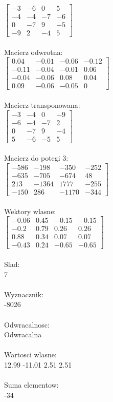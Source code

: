 \documentclass[a4paper,12pt]{article}
\begin{document}
$\begin{bmatrix} -3&-6&0&5\\-4&-4&-7&-6\\0&-7&9&-5\\-9&2&-4&5 \end{bmatrix}$
\\
\\
Macierz odwrotna:\\

$\begin{bmatrix} 0.04&-0.01&-0.06&-0.12\\-0.11&-0.04&-0.01&0.06\\-0.04&-0.06&0.08&0.04\\0.09&-0.06&-0.05&0 \end{bmatrix}$
\\
\\
Macierz transponowana:\\

$\begin{bmatrix} -3&-4&0&-9\\-6&-4&-7&2\\0&-7&9&-4\\5&-6&-5&5 \end{bmatrix}$
\\
\\
Macierz do potegi 3:\\

$\begin{bmatrix} -586&-198&-350&-252\\-635&-705&-674&48\\213&-1364&1777&-255\\-150&286&-1170&-344 \end{bmatrix}$
\\
\\
Wektory wlasne:\\

$\begin{bmatrix} -0.06&0.45&-0.15&-0.15\\-0.2&0.79&0.26&0.26\\0.88&0.34&0.07&0.07\\-0.43&0.24&-0.65&-0.65 \end{bmatrix}$
\\
\\
Slad:\\
7
\\
\\
Wyznacznik:\\
-8026
\\
\\
Odwracalnosc:\\
Odwracalna
\\
\\
Wartosci wlasne:\\
12.99 -11.01 2.51 2.51
\\
\\
Suma elementow:\\
-34
\\
\newpage
\end{document}
